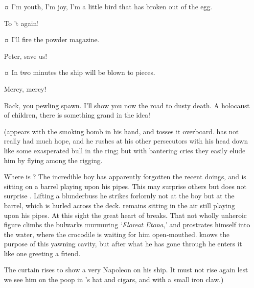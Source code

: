 \begin{drama}

\peterspeaks {}¤
I’m youth, I’m joy, I’m a little bird that has broken out of the egg.

\hookspeaks
To ’t again!


\hookspeaks {}¤
I’ll fire the powder magazine.

Peter, save us!


\hookspeaks {}¤
In two minutes the ship will be blown to pieces.


Mercy, mercy!

\hookspeaks
Back, you pewling spawn.
I’ll show you now the road to dusty death.
A holocaust of children, there is something grand in the idea!

\begin{stagedir}
(\peter appears with the smoking bomb in his hand, and tosses it overboard.
\hook has not really had much hope,
and he rushes at his other persecutors with his head down like some exasperated bull in the ring;
but with bantering cries they easily elude him by flying among the rigging.

Where is \peter?
The incredible boy has apparently forgotten the recent doings,
and is sitting on a barrel playing upon his pipes.
This may surprise others but does not surprise \hook.
Lifting a blunderbuss he strikes forlornly
not at the boy but at the barrel, which is hurled across the deck.
\peter remains sitting in the air still playing upon his pipes.
At this sight the great heart of \hook breaks.
That not wholly unheroic figure climbs the bulwarks murmuring ‘\emph{Floreat Etona},’
and prostrates himself into the water, where the crocodile is waiting for him open‐mouthed.
\hook knows the purpose of this yawning cavity,
but after what he has gone through he enters it like one greeting a friend.

The curtain rises to show \peter a very Napoleon on his ship.
It must not rise again lest we see him on the poop in \hook’s hat and cigars,
and with a small iron claw.)
\end{stagedir}

\end{drama}

\endinput
